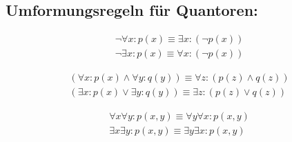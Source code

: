 \vspace{-.7cm}

\subsection*{Umformungsregeln für Quantoren:}
\begin{framed} [Negationsregeln]
  \begin{equation*}
    \begin{aligned}
      \neg \forall x : p(x) \equiv \exists x : (\neg p(x)) \\
      \neg \exists x : p(x) \equiv \forall x : (\neg p(x))	
    \end{aligned}
  \end{equation*}
\end{framed}

\vspace{-.7cm}

\begin{framed} [Ausklammerregeln]
  \begin{equation*}
    \begin{aligned}
      (\forall x : p(x) \wedge \forall y : q(y)) \equiv \forall z : (p(z) \wedge q(z)) \\
      (\exists x : p(x) \vee \exists y : q(y)) \equiv \exists z : (p(z) \vee q(z))
    \end{aligned}
  \end{equation*}
\end{framed}

\vspace{-.7cm}

\begin{framed} [Ausklammerregeln]
  \begin{equation*}
    \begin{aligned}
      \forall x \forall y : p(x,y) \equiv \forall y \forall x : p(x,y)\\
      \exists x \exists y : p(x,y) \equiv \exists y \exists x : p(x,y)
    \end{aligned}
  \end{equation*}
\end{framed}



